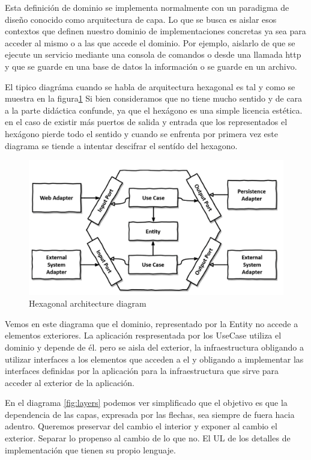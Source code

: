 Esta definición de dominio se implementa normalmente con un paradigma de diseño conocido como arquitectura de capa. Lo que se busca es aislar esos contextos que definen nuestro dominio de implementaciones concretas ya sea para acceder al mismo o a las que accede el dominio. Por ejemplo, aislarlo de que se ejecute un servicio mediante una consola de comandos o desde una llamada http y que se guarde en una base de datos la información o se guarde en un archivo.

El tipico diagráma cuando se habla de arquitectura hexagonal es tal y como se muestra en la figura\ref{fig:hexagonalDiagram} Si bien consideramos que no tiene mucho sentido y de cara a la parte didáctica confunde, ya que el hexágono es una simple licencia estética. en el caso de existir más puertos de salida y entrada que los representados el hexágono pierde todo el sentido y cuando se enfrenta por primera vez este diagrama se tiende a intentar descifrar el sentído del hexagono.

\begin{figure}[H]
    \centering
    \includegraphics[height=0.3\textheight]{./part/Ejecucion/Seguimiento/CreateTaskUseCase/img/HexagonalDiagram}
    \caption{Hexagonal architecture diagram\cite{TomHombergs2019GYHD}}\label{fig:hexagonalDiagram}
\end{figure}

Vemos en este diagrama que el dominio, representado por la Entity no accede a elementos exteriores. La aplicación respresentada por los UseCase utiliza el dominio y depende de él. pero se aisla del exterior, la infraestructura obligando a utilizar interfaces a los elementos que acceden a el y obligando a implementar las interfaces definidas por la aplicación para la infraestructura que sirve para acceder al exterior de la aplicación.

En el diagrama \ref{fig:layers} podemos ver simplificado que el objetivo es que la dependencia de las capas, expresada por las flechas, sea siempre de fuera hacia adentro. Queremos preservar del cambio el interior y exponer al cambio el exterior. Separar lo propenso al cambio de lo que no. El UL de los detalles de implementación que tienen su propio lenguaje.

